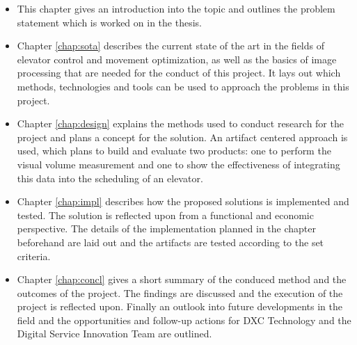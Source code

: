 \begin{itemize}
    \item This chapter gives an introduction into the topic and outlines the problem statement which is worked on in the thesis.
    \item Chapter \ref{chap:sota} describes the current state of the art in the fields of elevator control and movement optimization, as well as the basics of image processing that are needed for the conduct of this project. It lays out which methods, technologies and tools can be used to approach the problems in this project.
    \item Chapter \ref{chap:design} explains the methods used to conduct research for the project and plans a concept for the solution. An artifact centered approach is used, which plans to build and evaluate two products: one to perform the visual volume measurement and one to show the effectiveness of integrating this data into the scheduling of an elevator.
    \item Chapter \ref{chap:impl} describes how the proposed solutions is implemented and tested. The solution is reflected upon from a functional and economic perspective. The details of the implementation planned in the chapter beforehand are laid out and the artifacts are tested according to the set criteria.
    \item Chapter \ref{chap:concl} gives a short summary of the conduced method and the outcomes of the project. The findings are discussed and the execution of the project is reflected upon. Finally an outlook into future developments in the field and the opportunities and follow-up actions for DXC Technology and the Digital Service Innovation Team are outlined.
\end{itemize}